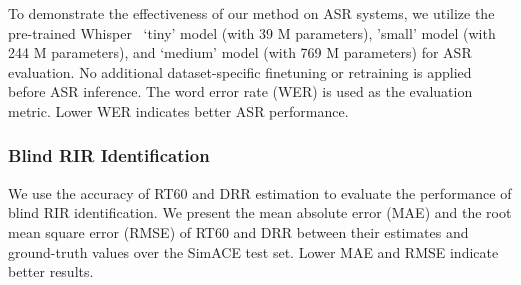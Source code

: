 To demonstrate the effectiveness of our method on ASR systems, we utilize the pre-trained Whisper~\cite{radford2023whisper} ‘tiny' model (with 39 M parameters), 'small' model (with 244 M parameters), and ‘medium’ model (with 769 M parameters) for ASR evaluation. 
No additional dataset-specific finetuning or retraining is applied before ASR inference. 
The word error rate (WER) is used as the evaluation metric.
Lower WER indicates better ASR performance.

\subsubsection{{Blind RIR Identification}}
We use the accuracy of RT60 and DRR estimation to evaluate the performance of blind RIR identification.
We present the mean absolute error (MAE) and the root mean square error (RMSE) of RT60 and DRR between their estimates and ground-truth values over the SimACE test set.
Lower MAE and RMSE indicate better results.